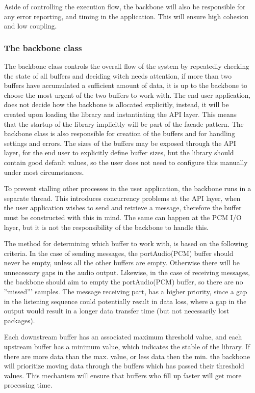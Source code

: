Aside of controlling the execution flow, the backbone will also be responsible for any error reporting, and timing in the application. This will ensure high cohesion and low coupling.

\subsubsection{The backbone class}
The backbone class controls the overall flow of the system by repeatedly checking the state of all buffers and deciding witch needs attention, if more than two buffers have accumulated a sufficient amount of data, it is up to the backbone to choose the most urgent of the two buffers to work with.
The end user application, does not decide how the backbone is allocated explicitly, instead, it will be created upon loading the library and instantiating the API layer. This means that the startup of the library implicitly will be part of the facade pattern.
The backbone class is also responsible for creation of the buffers and for handling settings and errors. The sizes of the buffers may be exposed through the API layer, for the end user to explicitly define buffer sizes, but the library should contain good default values, so the user does not need to configure this manually under most circumstances.

To prevent stalling other processes in the user application, the backbone runs in a separate thread. This introduces concurrency problems at the API layer, when the user application wishes to send and retrieve a message, therefore the buffer must be constructed with this in mind.
The same can happen at the PCM I/O layer, but it is not the responsibility of the backbone to handle this.

The method for determining which buffer to work with, is based on the following criteria.
In the case of sending messages, the portAudio(PCM) buffer should never be empty, unless all the other buffers are empty. Otherwise there will be unnecessary gaps in the audio output.
Likewise, in the case of receiving messages, the backbone should aim to empty the portAudio(PCM) buffer, so there are no ''missed''' samples.
The message receiving part, has a higher priority, since a gap in the listening sequence could potentially result in data loss, where a gap in the output would result in a longer data transfer time (but not necessarily lost packages).

Each downstream buffer has an associated maximum threshold value, and each upstream buffer has a minimum value, which indicates the stable of the library. If there are more data than the max. value, or less data then the min. the backbone will prioritize moving data through the buffers which has passed their threshold values. This mechanism will ensure that buffers who fill up faster will get more processing time.

